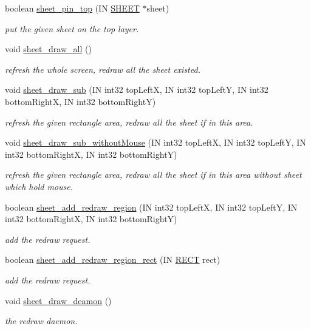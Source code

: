 \begin{DoxyCompactItemize}
boolean \hyperlink{group__sheet_ga6e435a2b89c42cc84bdc967e21f2d3ac}{sheet\+\_\+pin\+\_\+top} (I\+N \hyperlink{struct_s_h_e_e_t}{S\+H\+E\+E\+T} $\ast$sheet)
\begin{DoxyCompactList}\small\item\em put the given sheet on the top layer. \end{DoxyCompactList}\item 
void \hyperlink{group__sheet_ga60adeb9ceefccb6371183f12dbcc33ed}{sheet\+\_\+draw\+\_\+all} ()
\begin{DoxyCompactList}\small\item\em refresh the whole screen, redraw all the sheet existed. \end{DoxyCompactList}\item 
void \hyperlink{group__sheet_gaeb623f9ef3418510f8cace8a377a6611}{sheet\+\_\+draw\+\_\+sub} (I\+N int32 top\+Left\+X, I\+N int32 top\+Left\+Y, I\+N int32 bottom\+Right\+X, I\+N int32 bottom\+Right\+Y)
\begin{DoxyCompactList}\small\item\em refresh the given rectangle area, redraw all the sheet if in this area. \end{DoxyCompactList}\item 
void \hyperlink{group__sheet_gabdacf0bce47e8fd4e54bfce39ef6576d}{sheet\+\_\+draw\+\_\+sub\+\_\+without\+Mouse} (I\+N int32 top\+Left\+X, I\+N int32 top\+Left\+Y, I\+N int32 bottom\+Right\+X, I\+N int32 bottom\+Right\+Y)
\begin{DoxyCompactList}\small\item\em refresh the given rectangle area, redraw all the sheet if in this area without sheet which hold mouse. \end{DoxyCompactList}\item 
boolean \hyperlink{group__sheet_gaf4aa5d69cd5cf898b9a6430ca682c06d}{sheet\+\_\+add\+\_\+redraw\+\_\+region} (I\+N int32 top\+Left\+X, I\+N int32 top\+Left\+Y, I\+N int32 bottom\+Right\+X, I\+N int32 bottom\+Right\+Y)
\begin{DoxyCompactList}\small\item\em add the redraw request. \end{DoxyCompactList}\item 
boolean \hyperlink{group__sheet_gaac86a946b96df88ab655ec74a8fc4aa3}{sheet\+\_\+add\+\_\+redraw\+\_\+region\+\_\+rect} (I\+N \hyperlink{struct_r_e_c_t}{R\+E\+C\+T} rect)
\begin{DoxyCompactList}\small\item\em add the redraw request. \end{DoxyCompactList}\item 
void \hyperlink{group__sheet_gaec5e44c6cc2a850fd38a903e5d2abcb5}{sheet\+\_\+draw\+\_\+deamon} ()
\begin{DoxyCompactList}\small\item\em the redraw daemon. \end{DoxyCompactList}\end{DoxyCompactItemize}
